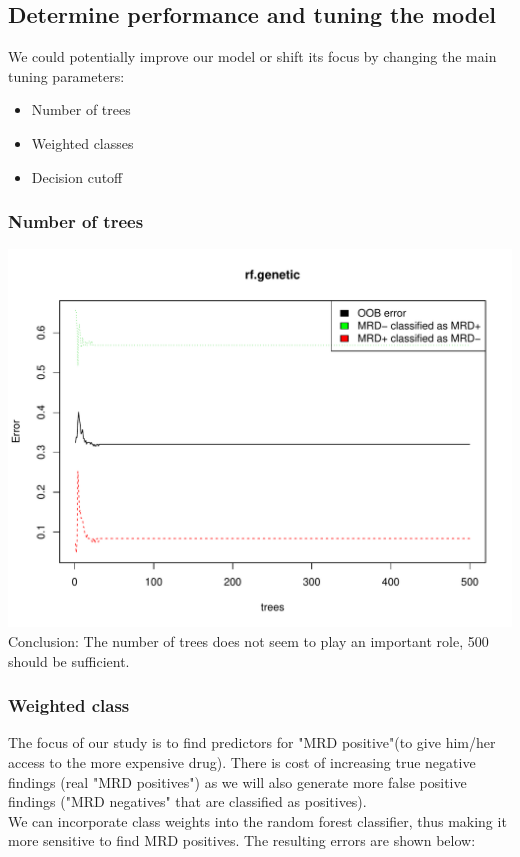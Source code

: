 \documentclass[a4paper,11pt]{article}
\begin{document}
\subsection{Determine performance and tuning the model}
We could potentially improve our model or shift its focus by changing the main tuning parameters:\\
\begin{itemize}
\item Number of trees
\item Weighted classes
\item Decision cutoff
\end{itemize}
\subsubsection{Number of trees}
\includegraphics{HICF1_Finalreportv4-015}
\\
Conclusion: The number of trees does not seem to play an important role, 500 should be sufficient.
 
\subsubsection{Weighted class}
The focus of our study is to find predictors for "MRD positive"(to give him/her access to the more expensive drug). There is cost of increasing true negative findings (real "MRD positives") as we will also generate more false positive findings ("MRD negatives" that are classified as positives).\\
We can incorporate class weights into the random forest classifier, thus making it more sensitive to find MRD positives. The resulting errors are shown below:\\
\end{document}
